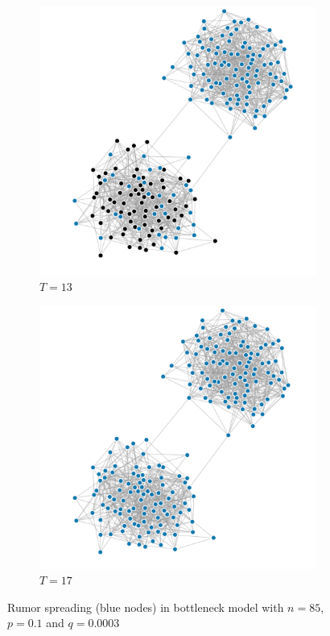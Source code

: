 \documentclass[10pt,journal,a4paper]{IEEEtran}
\begin{document}
\begin{figure}[h]
\begin{subfigure}[b]{.5\linewidth}
\includegraphics[width=1\linewidth]{figs/split-3}
\caption{$T=13$}
\end{subfigure}%
\begin{subfigure}[b]{.5\linewidth}
\includegraphics[width=1\linewidth]{figs/split-4}
\caption{$T=17$}
\end{subfigure}

\caption{Rumor spreading (blue nodes) in bottleneck model with $n=85$, $p = 0.1$ and $q = 0.0003$}
\label{barabasi-albert-graphs}
\end{figure}
\end{document}
